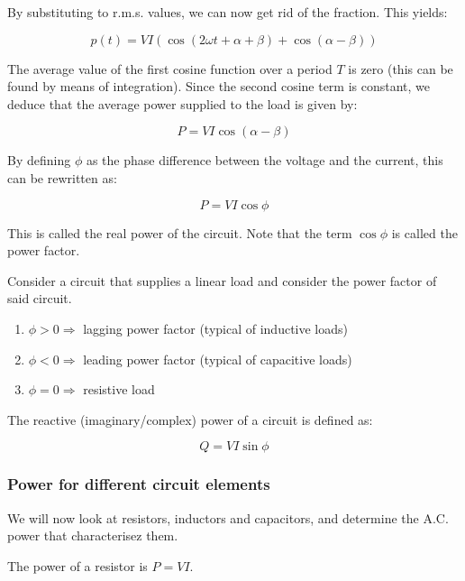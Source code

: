 \documentclass{article}
\begin{document}
By substituting to r.m.s. values, we can now get rid of the fraction. This yields:

\[ p(t) = VI(\cos{(2\omega t + \alpha + \beta)} + \cos{(\alpha - \beta)}) \]

The average value of the first cosine function over a period $T$ is zero (this can be found by means of integration). Since the second cosine term is constant, we deduce that the average power supplied to the load is given by:

\[ P = VI\cos{(\alpha - \beta)} \]

By defining $\phi$ as the phase difference between the voltage and the current, this can be rewritten as:

\[ P = VI\cos{\phi} \]

This is called the real power of the circuit. Note that the term $\cos{\phi}$ is called the power factor.

\begin{proposition}
    Consider a circuit that supplies a linear load and consider the power factor of said circuit.

    \begin{enumerate}
        \item $\phi > 0 \Rightarrow $ lagging power factor (typical of inductive loads)
        \item $\phi < 0 \Rightarrow $ leading power factor (typical of capacitive loads)
        \item $\phi = 0 \Rightarrow $ resistive load
    \end{enumerate}
\end{proposition}

\begin{definition}
    The reactive (imaginary/complex) power of a circuit is defined as:

    \[ Q = VI\sin{\phi} \]
\end{definition}

\subsubsection{Power for different circuit elements}

We will now look at resistors, inductors and capacitors, and determine the A.C. power that characterisez them.

\begin{proposition}
    The power of a resistor is $P = VI$.
\end{proposition}
\end{document}
